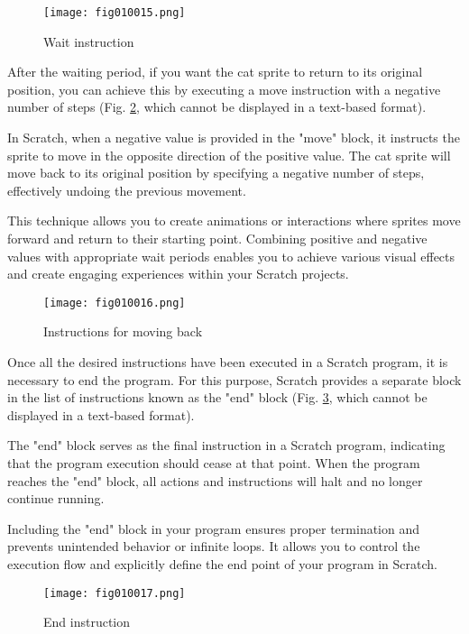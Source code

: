 \begin{figure}[H]
   \centering
   \texttt{[image: fig010015.png]}
   \caption{Wait instruction}
\label{fig010015}
\end{figure}

After the waiting period, if you want the cat sprite to return to its original position, you can achieve this by executing a move instruction with a negative number of steps (Fig. \ref{fig010016}, which cannot be displayed in a text-based format).

In Scratch, when a negative value is provided in the "move" block, it instructs the sprite to move in the opposite direction of the positive value. The cat sprite will move back to its original position by specifying a negative number of steps, effectively undoing the previous movement.

This technique allows you to create animations or interactions where sprites move forward and return to their starting point. Combining positive and negative values with appropriate wait periods enables you to achieve various visual effects and create engaging experiences within your Scratch projects.

\begin{figure}[H]
   \centering
   \texttt{[image: fig010016.png]}
   \caption{Instructions for moving back}
\label{fig010016}
\end{figure}

Once all the desired instructions have been executed in a Scratch program, it is necessary to end the program. For this purpose, Scratch provides a separate block in the list of instructions known as the "end" block (Fig. \ref{fig010017}, which cannot be displayed in a text-based format).

The "end" block serves as the final instruction in a Scratch program, indicating that the program execution should cease at that point. When the program reaches the "end" block, all actions and instructions will halt and no longer continue running.

Including the "end" block in your program ensures proper termination and prevents unintended behavior or infinite loops. It allows you to control the execution flow and explicitly define the end point of your program in Scratch.

\begin{figure}[H]
   \centering
   \texttt{[image: fig010017.png]}
   \caption{End instruction}
\label{fig010017}
\end{figure}

